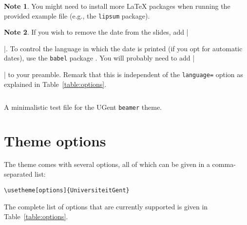 \documentclass[a4paper,10pt]{article}
\theoremstyle{definition}
\newtheorem{note}{Note}
\begin{document}
\begin{note}
  You might need to install more \LaTeX{} packages when running the provided example file (e.g., the \texttt{lipsum} package).
\end{note}

\begin{note}
  If you wish to remove the date from the slides, add |\date{}|. To control the language in which the date is printed (if you opt for automatic dates), use the \texttt{babel} package \cite{babel}. You will probably need to add |\usepackage[dutch]{babel}| to your preamble. Remark that this is independent of the \texttt{language=} option as explained in Table~\ref{table:options}.
\end{note}

\begin{listing}[ht]
  \inputminted[frame=lines]{latex}{minimal.tex}
  \caption{A minimalistic test file for the UGent \texttt{beamer} theme.}
  \label{listing:minimal-example}
\end{listing}


\section{Theme options}

The theme comes with several options, all of which can be given in a comma-separated list:
\begin{verbatim}
\usetheme[options]{UniversiteitGent}
\end{verbatim}
The complete list of options that are currently supported is given in Table~\ref{table:options}.
\end{document}
